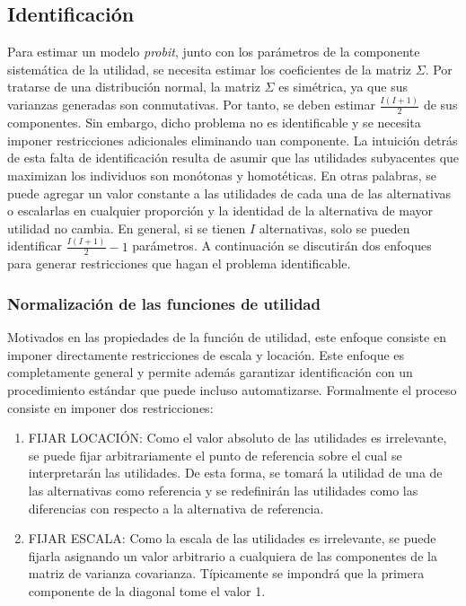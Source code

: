 \documentclass[
]{book}
\begin{document}
\subsection{Identificación}\label{identificaciuxf3n}

Para estimar un modelo \emph{probit}, junto con los parámetros de la componente sistemática de la utilidad, se necesita estimar los coeficientes de la matriz \(\Sigma\). Por tratarse de una distribución normal, la matriz \(\Sigma\) es simétrica, ya que sus varianzas generadas son conmutativas. Por tanto, se deben estimar \(\frac{I(I+1)}{2}\) de sus componentes. Sin embargo, dicho problema no es identificable y se necesita imponer restricciones adicionales eliminando uan componente. La intuición detrás de esta falta de identificación resulta de asumir que las utilidades subyacentes que maximizan los individuos son monótonas y homotéticas. En otras palabras, se puede agregar un valor constante a las utilidades de cada una de las alternativas o escalarlas en cualquier proporción y la identidad de la alternativa de mayor utilidad no cambia. En general, si se tienen \(I\) alternativas, solo se pueden identificar \(\frac{I(I+1)}{2} - 1\) parámetros. A continuación se discutirán dos enfoques para generar restricciones que hagan el problema identificable.

\subsubsection{Normalización de las funciones de utilidad}\label{normalizaciuxf3n-de-las-funciones-de-utilidad}

Motivados en las propiedades de la función de utilidad, este enfoque consiste en imponer directamente restricciones de escala y locación. Este enfoque es completamente general y permite además garantizar identificación con un procedimiento estándar que puede incluso automatizarse. Formalmente el proceso consiste en imponer dos restricciones:

\begin{enumerate}
\def\labelenumi{\arabic{enumi}.}
\item
  FIJAR LOCACIÓN: Como el valor absoluto de las utilidades es irrelevante, se puede fijar arbitrariamente el punto de referencia sobre el cual se interpretarán las utilidades. De esta forma, se tomará la utilidad de una de las alternativas como referencia y se redefinirán las utilidades como las diferencias con respecto a la alternativa de referencia.
\item
  FIJAR ESCALA: Como la escala de las utilidades es irrelevante, se puede fijarla asignando un valor arbitrario a cualquiera de las componentes de la matriz de varianza covarianza. Típicamente se impondrá que la primera componente de la diagonal tome el valor 1.
\end{enumerate}
\end{document}
